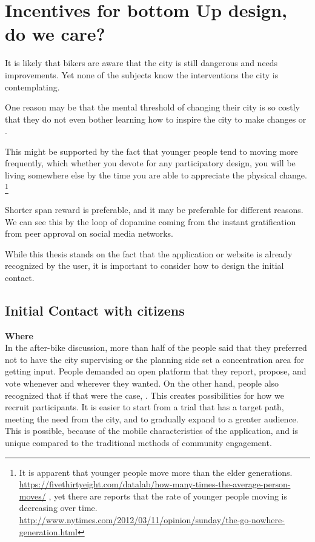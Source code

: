 \section{Incentives for bottom Up design, do we care?}
\label{sec:incent}

It is likely that bikers are aware that the city is still dangerous and needs improvements. Yet none of the subjects know the interventions the city is contemplating.

One reason may be that the mental threshold of changing their city is so costly that they do not even bother learning how to inspire the city to make changes or .

This might be supported by the fact that younger people tend to moving more frequently, which whether you devote for any participatory design, you will be living somewhere else by the time you are able to appreciate the physical change.
\footnote{It is apparent that younger people move more than the elder generations. 
\url{https://fivethirtyeight.com/datalab/how-many-times-the-average-person-moves/}
, yet there are reports that the rate of younger people moving is decreasing over time.\\
\url{http://www.nytimes.com/2012/03/11/opinion/sunday/the-go-nowhere-generation.html}
}

Shorter span reward is preferable, and it may be preferable for different reasons. We can see this by the
loop of dopamine coming from the instant gratification from peer approval on social media networks.

While this thesis stands on the fact that the application or website is already recognized by the user,
it is important to consider how to design the initial contact.

\subsection{Initial Contact with citizens}

\textbf{Where} \\ 
In the after-bike discussion, more than half of the people said that they preferred not to have the city supervising or the planning side set a concentration area for getting input. People demanded an open platform that they report, propose, and vote whenever and wherever they wanted. On the other hand, people also recognized that if that were the case, . This creates possibilities for how we recruit participants. It is easier to start from a trial that has a target path, meeting the need from the city, and to gradually expand to a greater audience. This is possible, because of the mobile characteristics of the application, and is unique compared to the traditional methods of community engagement.

